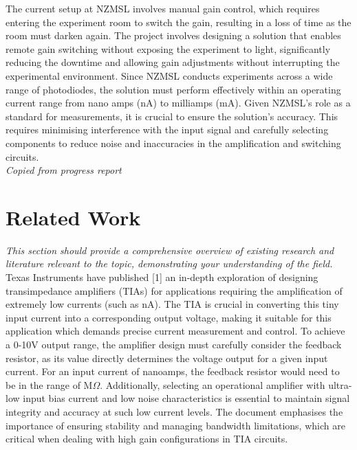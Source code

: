 \documentclass[conference]{IEEEtran}
\begin{document}
The current setup at NZMSL involves manual gain control, which requires entering the experiment room to switch the gain, resulting in a loss of time as the room must darken again. The project involves designing a solution that enables remote gain switching without exposing the experiment to light, significantly reducing the downtime and allowing gain adjustments without interrupting the experimental environment.
Since NZMSL conducts experiments across a wide range of photodiodes, the solution must perform effectively within an operating current range from nano amps (nA) to milliamps (mA). Given NZMSL's role as a standard for measurements, it is crucial to ensure the solution's accuracy. This requires minimising interference with the input signal and carefully selecting components to reduce noise and inaccuracies in the amplification and switching circuits. \\
\textit{Copied from progress report}

\section{Related Work}

\textit{This section should provide a comprehensive overview of existing research and literature relevant to the topic, demonstrating your understanding of the field.} \\

Texas Instruments have published [1] an in-depth exploration of designing transimpedance amplifiers (TIAs) for applications requiring the amplification of extremely low currents (such as nA). The TIA is crucial in converting this tiny input current into a corresponding output voltage, making it suitable for this application which demands precise current measurement and control. To achieve a 0-10V output range, the amplifier design must carefully consider the feedback resistor, as its value directly determines the voltage output for a given input current. For an input current of nanoamps, the feedback resistor would need to be in the range of M$\Omega$. Additionally, selecting an operational amplifier with ultra-low input bias current and low noise characteristics is essential to maintain signal integrity and accuracy at such low current levels. The document emphasises the importance of ensuring stability and managing bandwidth limitations, which are critical when dealing with high gain configurations in TIA circuits.
\end{document}
